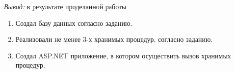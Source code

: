 \documentclass[pscyr]{hedlab}
\begin{document}
    \emph{Вывод:} в результате проделанной работы
    \begin{enumerate}
        \item Создал базу данных согласно заданию.
        \item Реализовали не менее 3-х хранимых процедур, согласно заданию.
        \item Создал ASP.NET приложение, в котором осуществить вызов хранимых процедур.
    \end{enumerate}
\end{document}
